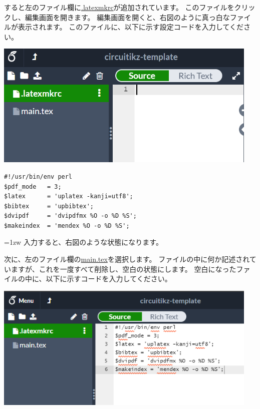 			\noindent
			\begin{minipage}{0.4\hsize}
				すると左のファイル欄に\url{.latexmkrc}が追加されています。
				このファイルをクリックし、編集画面を開きます。
				編集画面を開くと、右図のように真っ白なファイルが表示されます。
				このファイルに、以下に示す設定コードを入力してください。
			\end{minipage}\hfill
			\begin{minipage}{0.6\hsize}
				\begin{flushright}
					\includegraphics[width=0.95\textwidth]{overleaf-editer-latexmkrc.png}
				\end{flushright}
			\end{minipage}

			\begin{mdframed}
				\begin{verbatim}
#!/usr/bin/env perl
$pdf_mode   = 3;
$latex      = 'uplatex -kanji=utf8';
$bibtex     = 'upbibtex';
$dvipdf     = 'dvipdfmx %O -o %D %S';
$makeindex  = 'mendex %O -o %D %S';
				\end{verbatim}
			\end{mdframed}

			\noindent
			\begin{minipage}{0.4\hsize}\parindent=1zw
				入力すると、右図のような状態になります。

				次に、左のファイル欄の\url{main.tex}を選択します。
				ファイルの中に何か記述されていますが、これを一度すべて削除し、空白の状態にします。
				空白になったファイルの中に、以下に示すコードを入力してください。
			\end{minipage}\hfill
			\begin{minipage}{0.6\hsize}
				\begin{flushright}
					\includegraphics[width=0.95\textwidth]{overleaf-text-latexmkrc.png}
				\end{flushright}
			\end{minipage}


